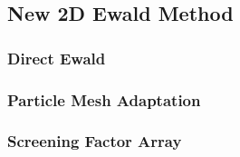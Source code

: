     \subsection{New 2D Ewald Method}
        \subsubsection{Direct Ewald}
        
        
        \subsubsection{Particle Mesh Adaptation}
        

        \subsubsection{Screening Factor Array}
        
        
